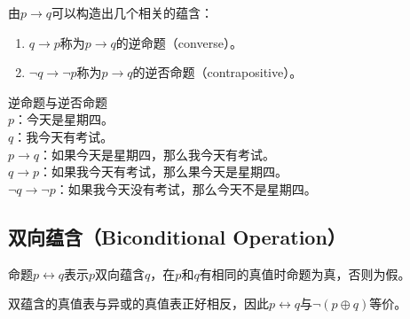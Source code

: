 由$ p \rightarrow q $可以构造出几个相关的蕴含：

\begin{enumerate}
	\item $ q \rightarrow p $称为$ p \rightarrow q $的逆命题（converse）。
	\item $ \neg q \rightarrow \neg p $称为$ p \rightarrow q $的逆否命题（contrapositive）。
\end{enumerate}

\begin{tcolorbox}
	逆命题与逆否命题\\
	$ p $：今天是星期四。\\
	$ q $：我今天有考试。\\
	$ p \rightarrow q $：如果今天是星期四，那么我今天有考试。\\
	$ q \rightarrow p $：如果我今天有考试，那么果今天是星期四。\\
	$ \neg q \rightarrow \neg p $：如果我今天没有考试，那么今天不是星期四。
\end{tcolorbox}

\vspace{0.5cm}

\subsection{双向蕴含（Biconditional Operation）}

命题$ p \leftrightarrow q $表示$ p $双向蕴含$ q $，在$ p $和$ q $有相同的真值时命题为真，否则为假。

\begin{table}[H]
	\centering
	\caption{双向蕴含真值表}
\end{table}

双蕴含的真值表与异或的真值表正好相反，因此$ p \leftrightarrow q $与$ \neg (p \oplus q) $等价。

